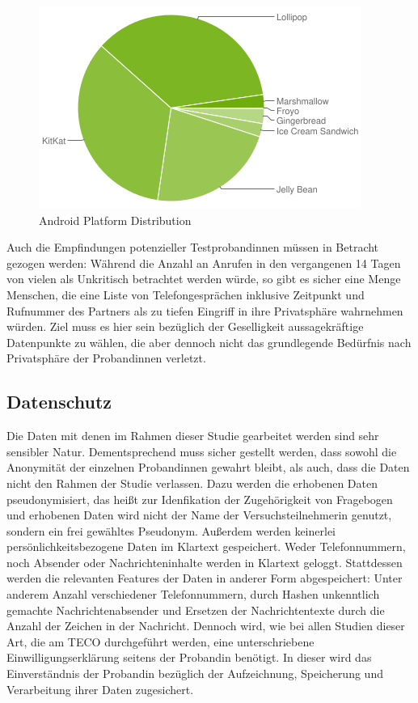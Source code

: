 \begin{figure}[h]
    \centering
    \includegraphics{images/chart.png}
    \caption{Android Platform Distribution\cite{androiddistr}}
    \label{fig:androidplatformdistr}
\end{figure}

Auch die Empfindungen potenzieller Testprobandinnen müssen in Betracht gezogen werden:
Während die Anzahl an Anrufen in den vergangenen 14 Tagen von vielen als Unkritisch betrachtet werden würde, so gibt es sicher eine Menge Menschen, 
die eine Liste von Telefongesprächen inklusive Zeitpunkt und Rufnummer des Partners als zu tiefen Eingriff in ihre Privatsphäre wahrnehmen würden.
Ziel muss es hier sein bezüglich der Geselligkeit aussagekräftige Datenpunkte zu wählen, 
die aber dennoch nicht das grundlegende Bedürfnis nach Privatsphäre der Probandinnen verletzt.


\subsection{Datenschutz}

Die Daten mit denen im Rahmen dieser Studie gearbeitet werden sind sehr sensibler Natur.
Dementsprechend muss sicher gestellt werden, dass sowohl die Anonymität der einzelnen Probandinnen gewahrt bleibt,
als auch, dass die Daten nicht den Rahmen der Studie verlassen.
Dazu werden die erhobenen Daten pseudonymisiert, das heißt zur Idenfikation der Zugehörigkeit von Fragebogen und erhobenen Daten wird nicht der Name der Versuchsteilnehmerin genutzt, sondern ein frei gewähltes Pseudonym.
Außerdem werden keinerlei persönlichkeitsbezogene Daten im Klartext gespeichert.
Weder Telefonnummern, noch Absender oder Nachrichteninhalte werden in Klartext geloggt.
Stattdessen werden die relevanten Features der Daten in anderer Form abgespeichert:
Unter anderem Anzahl verschiedener Telefonnummern, durch Hashen unkenntlich gemachte Nachrichtenabsender und Ersetzen der Nachrichtentexte durch die Anzahl der Zeichen in der Nachricht.
Dennoch wird, wie bei allen Studien dieser Art, die am TECO durchgeführt werden,
eine unterschriebene Einwilligungserklärung seitens der Probandin benötigt.
In dieser wird das Einverständnis der Probandin bezüglich der Aufzeichnung, Speicherung und Verarbeitung ihrer Daten zugesichert.
\par



